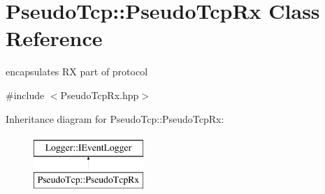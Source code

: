 \hypertarget{classPseudoTcp_1_1PseudoTcpRx}{
\section{PseudoTcp::PseudoTcpRx Class Reference}
\label{classPseudoTcp_1_1PseudoTcpRx}
}


encapsulates RX part of protocol  




{\ttfamily \#include $<$PseudoTcpRx.hpp$>$}

Inheritance diagram for PseudoTcp::PseudoTcpRx:\begin{figure}[H]
\begin{center}
\leavevmode
\includegraphics[height=2cm]{classPseudoTcp_1_1PseudoTcpRx}
\end{center}
\end{figure}
